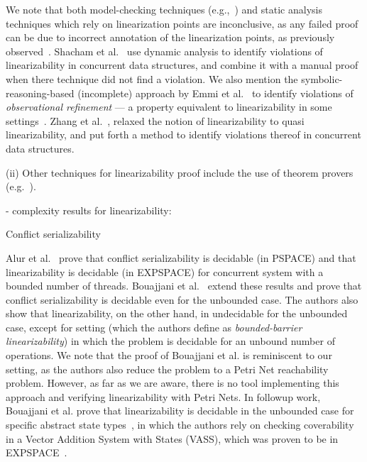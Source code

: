 We note that both model-checking techniques (e.g.,~\cite{CeRaZuChAl10}) and static analysis techniques which rely on linearization points are inconclusive, as any failed proof can be due to incorrect annotation of the linearization points, as previously observed~\cite{BoEmCoHa15}.
%
Shacham et al.~\cite{ShBrAiSaVeYa11} use dynamic analysis to identify violations of linearizability in concurrent data structures, and combine it with a manual proof when there technique did not find a violation.
%
We also mention the symbolic-reasoning-based (incomplete) approach by Emmi et al.~\cite{EmEnHa15} to identify violations of \textit{observational refinement} --- a property equivalent to linearizability in some settings~\cite{FiOhRiYa10, BoEmCoHa15}.
%
Zhang et al.~\cite{ZhChWa13}, relaxed the notion of linearizability to quasi linearizability, and put forth a method to identify violations thereof in concurrent data structures.







(ii) Other techniques for linearizability proof include the use of theorem provers (e.g.~\cite{CoDoGr05, DeScWe11}).


- complexity results for linearizability:

Conflict serializability

Alur et al.~\cite{AlMcPe96} prove that conflict serializability is decidable 
(in PSPACE) and that linearizability is decidable (in EXPSPACE) for concurrent 
system with a bounded number of threads.
%
Bouajjani et al.~\cite{BoEmEnHa13} extend these results and prove that conflict serializability is decidable even for the unbounded case. The authors also show that linearizability, on the other hand, in undecidable for the unbounded case, except for setting (which the authors define as \textit{bounded-barrier linearizability}) in which the problem is decidable for an unbound number of operations.
%
We note that the proof of Bouajjani et al. is reminiscent to our setting, as the authors also reduce the problem to a Petri Net reachability problem.
%
However, as far as we are aware, there is no tool implementing this approach and verifying linearizability with Petri Nets.
%
In followup work, Bouajjani et al. prove that linearizability is decidable in 
the unbounded case for specific abstract state types~\cite{BoEmEnHa18}, in 
which the authors rely on checking coverability in a Vector Addition System 
with States (VASS), which was proven to be in EXPSPACE~\cite{Ra78}.


